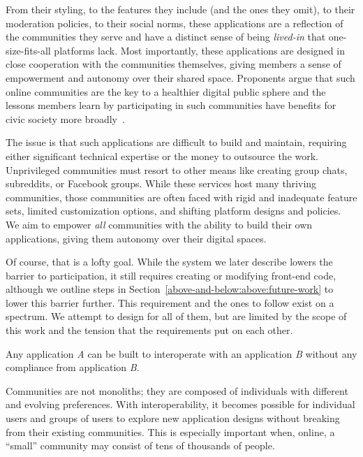 From their styling, to the features they include (and the ones they omit),
to their moderation policies, to their social norms, these applications
are a reflection of the communities they serve and have a
distinct sense of being \emph{lived-in}
that one-size-fits-all platforms lack.
Most importantly, these applications are designed in close cooperation with the communities themselves,
giving members a sense of empowerment and autonomy over their shared space.
Proponents argue that such online communities are the key to a healthier
digital public sphere and the lessons members learn by participating in such
communities have benefits for civic society more broadly~\cite{threeleggedstool, runyourownsocial, archiveoftheirown}.

The issue is that such applications are difficult to build and maintain,
requiring either significant technical expertise or the money to outsource the work.
Unprivileged communities must resort to other means like creating group chats,
subreddits, or Facebook groups. %
While these services host many thriving communities,
those communities are often faced with rigid and inadequate feature sets,
limited customization options, and shifting platform designs and policies.
We aim to empower \emph{all} communities with the ability to
build their own applications, giving them autonomy over their digital spaces.

Of course, that is a lofty goal. While the system
we later describe lowers the barrier to participation,
it still requires creating or modifying front-end code, although
we outline steps in Section~\ref{above-and-below:above:future-work}
to lower this barrier further.
This requirement and the ones to follow exist on a spectrum.
We attempt to design for all of them, but are limited by
the scope of this work and the tension that the requirements put
on each other.

\begin{requirement}
\label{requirements:adversarial-interop}
Any application \emph{A} can be built to interoperate with an application \emph{B} without any compliance from application \emph{B}.
\end{requirement}

Communities are not monoliths; they are composed of individuals
with different and evolving preferences.
With interoperability, it becomes possible for individual users and groups of users to explore new application designs
without breaking from their existing communities.
This is especially important when, online, a ``small''
community may consist of tens of thousands of people.


